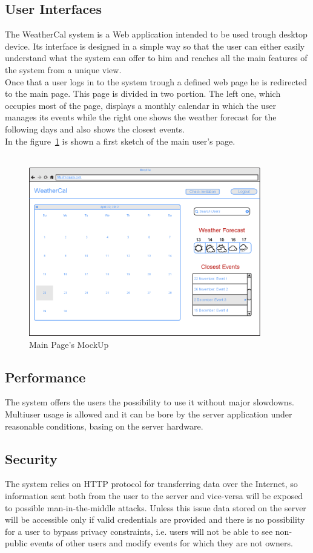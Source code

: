 \subsection{User Interfaces}
The WeatherCal system is a Web application intended to be used trough desktop device.  Its interface is designed in a simple way so that  the user can either easily understand what the system can offer to him and reaches all the main features of the system from a unique view.\\
Once that a user logs in to the system trough a defined web page he is redirected to the main page. This page is divided in two portion. The left one, which occupies most of the page, displays a monthly calendar in which the user manages its events while the right one shows the weather forecast for the following days and also shows the closest events.\\In the figure~\ref{fig:mockup} is shown a first sketch of the main user's page.\\ \\  
 \begin{center}
 \begin{figure}
    \includegraphics[width=0.9\textwidth]{immagini/UserPage.png}
    \caption{Main Page's MockUp}
     \label{fig:mockup}
     \end{figure}
    \end{center}
\subsection{Performance}
The system offers the users the possibility to use it without major slowdowns. Multiuser usage is allowed and it can be bore by the server application under reasonable conditions, basing on the server hardware.
\subsection{Security}
The system relies on HTTP protocol for transferring data over the Internet, so information sent both from the user to the server and vice-versa will be exposed to possible man-in-the-middle attacks. Unless this issue data stored on the server will be accessible only if valid credentials are provided and there is no possibility for a user to bypass privacy constraints, i.e. users will not be able to see non-public events of other users and modify events for which they are not owners.

